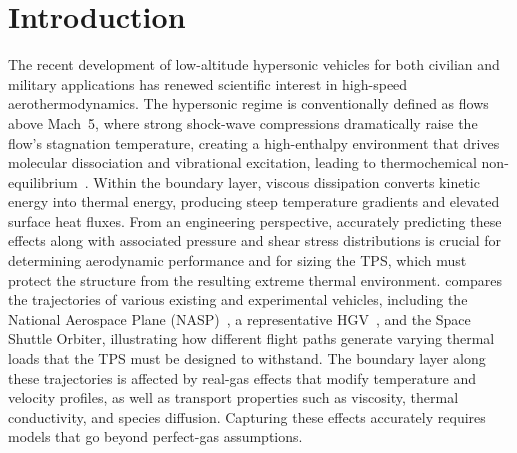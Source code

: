\chapter{Introduction}\label{chapter:introduction}

The recent development of low-altitude hypersonic vehicles for both civilian and military applications has renewed scientific interest in high-speed aerothermodynamics. The hypersonic regime is conventionally defined as flows above Mach~5, where strong shock-wave compressions dramatically raise the flow's stagnation temperature, creating a high-enthalpy environment that drives molecular dissociation and vibrational excitation, leading to thermochemical non-equilibrium~\citep{Candler2019}. Within the boundary layer, viscous dissipation converts kinetic energy into thermal energy, producing steep temperature gradients and elevated surface heat fluxes. From an engineering perspective, accurately predicting these effects along with associated pressure and shear stress distributions is crucial for determining aerodynamic performance and for sizing the \gls{TPS}, which must protect the structure from the resulting extreme thermal environment.  compares the trajectories of various existing and experimental vehicles, including the National Aerospace Plane (NASP)~\citep{DSB1988,DSB1992}, a representative \gls{HGV}~\citep{Rizvi2015}, and the Space Shuttle Orbiter, illustrating how different flight paths generate varying thermal loads that the \gls{TPS} must be designed to withstand. The boundary layer along these trajectories is affected by real-gas effects that modify temperature and velocity profiles, as well as transport properties such as viscosity, thermal conductivity, and species diffusion. Capturing these effects accurately requires models that go beyond perfect-gas assumptions.

